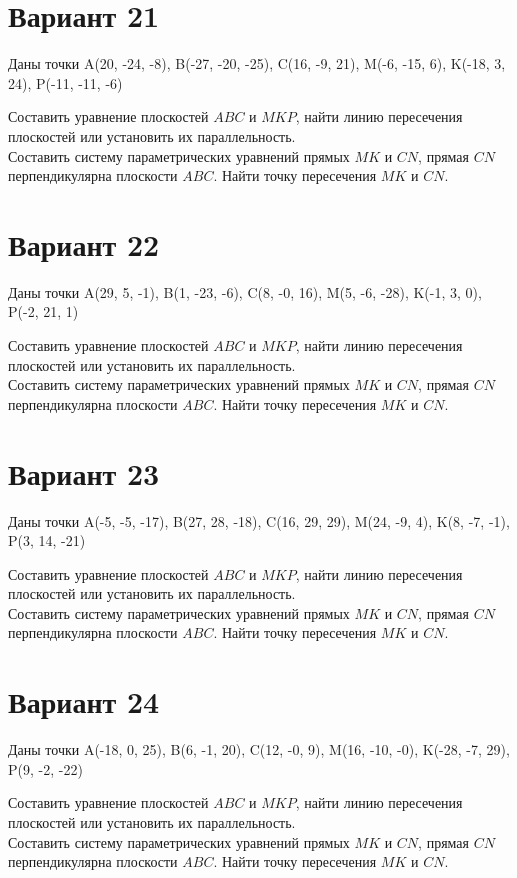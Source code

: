 \documentclass[11pt]{article}
\begin{document}
\section*{Вариант 21}
Даны точки A(20, -24, -8), B(-27, -20, -25), C(16, -9, 21), M(-6, -15, 6), K(-18, 3, 24), P(-11, -11, -6)

Составить уравнение плоскостей $ABC$ и $MKP$, найти линию пересечения плоскостей или установить их параллельность.\\
Составить систему параметрических уравнений прямых $MK$ и $CN$, прямая $CN$ перпендикулярна плоскости $ABC$. Найти точку пересечения $MK$ и $CN$.

\section*{Вариант 22}
Даны точки A(29, 5, -1), B(1, -23, -6), C(8, -0, 16), M(5, -6, -28), K(-1, 3, 0), P(-2, 21, 1)

Составить уравнение плоскостей $ABC$ и $MKP$, найти линию пересечения плоскостей или установить их параллельность.\\
Составить систему параметрических уравнений прямых $MK$ и $CN$, прямая $CN$ перпендикулярна плоскости $ABC$. Найти точку пересечения $MK$ и $CN$.

\section*{Вариант 23}
Даны точки A(-5, -5, -17), B(27, 28, -18), C(16, 29, 29), M(24, -9, 4), K(8, -7, -1), P(3, 14, -21)

Составить уравнение плоскостей $ABC$ и $MKP$, найти линию пересечения плоскостей или установить их параллельность.\\
Составить систему параметрических уравнений прямых $MK$ и $CN$, прямая $CN$ перпендикулярна плоскости $ABC$. Найти точку пересечения $MK$ и $CN$.

\section*{Вариант 24}
Даны точки A(-18, 0, 25), B(6, -1, 20), C(12, -0, 9), M(16, -10, -0), K(-28, -7, 29), P(9, -2, -22)

Составить уравнение плоскостей $ABC$ и $MKP$, найти линию пересечения плоскостей или установить их параллельность.\\
Составить систему параметрических уравнений прямых $MK$ и $CN$, прямая $CN$ перпендикулярна плоскости $ABC$. Найти точку пересечения $MK$ и $CN$.
\end{document}
